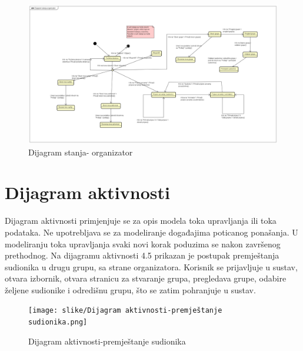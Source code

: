 		\begin{figure}[H]
			\centerline{\includegraphics[width=\linewidth]{slike/Dijagram_stanja_organizator.png}}
			\caption{Dijagram stanja- organizator }
			\label{fig:dijagram_stanja_organizator}
		\end{figure}
		
		\eject	
		
		\section{Dijagram aktivnosti}
		
		Dijagram aktivnosti primjenjuje se za opis modela toka upravljanja ili toka podataka. Ne upotrebljava se za modeliranje događajima poticanog ponašanja. U modeliranju toka upravljanja svaki novi korak poduzima se nakon završenog prethodnog. Na dijagramu aktivnosti 4.5 prikazan je postupak premještanja sudionika u drugu grupu, sa strane organizatora. Korisnik se prijavljuje u sustav, otvara izbornik, otvara stranicu za stvaranje grupa, pregledava grupe, odabire željene sudionike i odredišnu grupu, što se zatim pohranjuje u sustav.
			\begin{figure}[H]
			\centerline{\texttt{[image: slike/Dijagram aktivnosti-premještanje sudionika.png]}}
			\caption{Dijagram aktivnosti-premještanje sudionika}
			\label{fig:dijagram_aktivnosti}
		\end{figure}
		
		\eject		

		
	